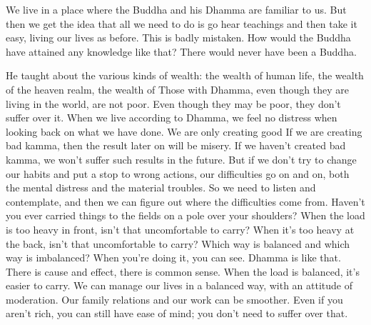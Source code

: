 We live in a place where the Buddha and his Dhamma are familiar to us. But then we get the idea that all we need to do is go hear teachings and then take it easy, living our lives as before. This is badly mistaken. How would the Buddha have attained any knowledge like that? There would never have been a Buddha. 

He taught about the various kinds of wealth: the wealth of human life, the wealth of the heaven realm, the wealth of  Those with Dhamma, even though they are living in the world, are not poor. Even though they may be poor, they don't suffer over it. When we live according to Dhamma, we feel no distress when looking back on what we have done. We are only creating good  If we are creating bad kamma, then the result later on will be misery. If we haven't created bad kamma, we won't suffer such results in the future. But if we don't try to change our habits and put a stop to wrong actions, our difficulties go on and on, both the mental distress and the material troubles. So we need to listen and contemplate, and then we can figure out where the difficulties come from. Haven't you ever carried things to the fields on a pole over your shoulders? When the load is too heavy in front, isn't that uncomfortable to carry? When it's too heavy at the back, isn't that uncomfortable to carry? Which way is balanced and which way is imbalanced? When you're doing it, you can see. Dhamma is like that. There is cause and effect, there is common sense. When the load is balanced, it's easier to carry. We can manage our lives in a balanced way, with an attitude of moderation. Our family relations and our work can be smoother. Even if you aren't rich, you can still have ease of mind; you don't need to suffer over that. 

